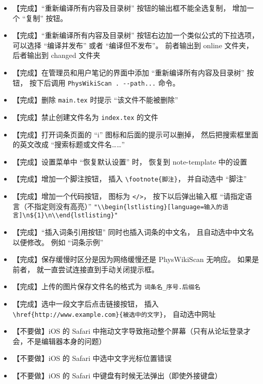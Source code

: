 \begin{itemize}
\item 【完成】“重新编译所有内容及目录树” 按钮的输出框不能全选复制， 增加一个 “复制” 按钮。

\item 【完成】“重新编译所有内容及目录树” 按钮右边加一个类似公式的下拉选项， 可以选择 “编译并发布” 或者 “编译但不发布”。 前者输出到 online 文件夹， 后者输出到 changed 文件夹

\item 【完成】在管理员和用户笔记的界面中添加 “重新编译所有内容及目录树” 按钮， 按下后调用 \lstinline|PhysWikiScan . --path...|  命令。

\item 【完成】删除 \verb|main.tex| 时提示 “该文件不能被删除”

\item 【完成】禁止创建文件名为 \lstinline|index.tex| 的文件

\item 【完成】打开词条页面的 “i” 图标和后面的提示可以删掉， 然后把搜索框里面的英文改成 “搜索标题或文件名……”

\item 【完成】设置菜单中 “恢复默认设置” 时， 恢复到 note-template 中的设置

\item 【完成】增加一个脚注按钮， 插入 \lstinline|\footnote{脚注}|， 并自动选中 “脚注”

\item 【完成】增加一个代码按钮， 图标为 \lstinline|</>|， 按下以后弹出输入框 “请指定语言（不指定则没有高亮）” \verb|"\\begin{lstlisting}[language=输入的语言]\n${1}\n\\end{lstlisting}"|

\item 【完成】“插入词条引用按钮” 同时也插入词条的中文名， 且自动选中中文名以便修改。 例如 “词条示例”

\item 【完成】保存缓慢时区分是因为网络缓慢还是 PhysWikiScan 无响应。 如果是前者， 就一直尝试连接直到手动关闭提示框。

\item 【完成】上传的图片保存文件名的格式为 \verb|词条名_序号.后缀名|

\item 【完成】选中一段文字后点击链接按钮， 插入 \lstinline|\href{http://www.example.com}{被选中的文字}|， 自动选中网址

\item 【不要做】iOS 的 Safari 中拖动文字导致拖动整个屏幕（只有从论坛登录才会，不是编辑器本身的问题）

\item 【不要做】iOS 的 Safari 中选中文字光标位置错误

\item 【不要做】iOS 的 Safari 中键盘有时候无法弹出（即使外接键盘）
\end{itemize}

